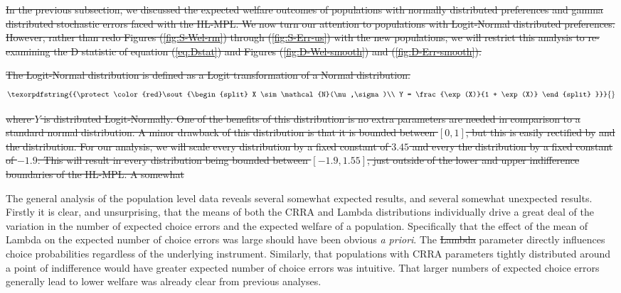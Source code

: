 \documentclass[11pt,a4paper]{report}
\providecommand{\DIFaddtex}[1]{{\protect\color{blue}\uwave{#1}}} %
\providecommand{\DIFdeltex}[1]{{\protect\color{red}\sout{#1}}}                      %
\providecommand{\DIFaddbegin}{} %
\providecommand{\DIFaddend}{} %
\providecommand{\DIFdelbegin}{} %
\providecommand{\DIFdelend}{} %
\providecommand{\DIFadd}[1]{\texorpdfstring{\DIFaddtex{#1}}{#1}} %
\providecommand{\DIFdel}[1]{\texorpdfstring{\DIFdeltex{#1}}{}} %
\newcommand{\DIFscaledelfig}{0.5}
\newlength{\DIFdelgraphicswidth} %
\newlength{\DIFdelgraphicsheight} %
\newcommand{\DIFaddincludegraphics}[2][]{{\color{blue}\fbox{\DIFOincludegraphics[#1]{#2}}}} %
\newcommand{\DIFdelincludegraphics}[2][]{%
\sbox{\DIFdelgraphicsbox}{\DIFOincludegraphics[#1]{#2}}%
\settoboxwidth{\DIFdelgraphicswidth}{\DIFdelgraphicsbox} %
\settoboxtotalheight{\DIFdelgraphicsheight}{\DIFdelgraphicsbox} %
\scalebox{\DIFscaledelfig}{%
\parbox[b]{\DIFdelgraphicswidth}{\usebox{\DIFdelgraphicsbox}\\[-\baselineskip] \rule{\DIFdelgraphicswidth}{0em}}\llap{\resizebox{\DIFdelgraphicswidth}{\DIFdelgraphicsheight}{%
\setlength{\unitlength}{\DIFdelgraphicswidth}%
\begin{picture}(1,1)%
\thicklines\linethickness{2pt} %
{\color[rgb]{1,0,0}\put(0,0){\framebox(1,1){}}}%
{\color[rgb]{1,0,0}\put(0,0){\line( 1,1){1}}}%
{\color[rgb]{1,0,0}\put(0,1){\line(1,-1){1}}}%
\end{picture}%
}\hspace*{3pt}}} %
} %
\DeclareRobustCommand{\DIFaddbegin}{\DIFOaddbegin \let\includegraphics\DIFaddincludegraphics} %
\DeclareRobustCommand{\DIFaddend}{\DIFOaddend \let\includegraphics\DIFOincludegraphics} %
\DeclareRobustCommand{\DIFdelbegin}{\DIFOdelbegin \let\includegraphics\DIFdelincludegraphics} %
\DeclareRobustCommand{\DIFdelend}{\DIFOaddend \let\includegraphics\DIFOincludegraphics} %
\begin{document}
\DIFdelbegin \DIFdel{In the previous subsection, we discussed the expected welfare outcomes of populations with normally distributed preferences and gamma distributed stochastic errors faced with the HL-MPL.
We now turn our attention to populations with Logit-Normal distributed preferences.
However, rather than redo Figures (\ref{fig:S-Wel-rm}) through (\ref{fig:S-Err-us}) with the new populations, we will restrict this analysis to re-examining the D statistic of equation (\ref{eq:Dstat}) and Figures (\ref{fig:D-Wel-smooth}) and (\ref{fig:D-Err-smooth}).
}%

\DIFdel{The Logit-Normal distribution is defined as a Logit transformation of a Normal distribution.
}\begin{align*}
	\DIFdel{\begin{split}
		X \sim \mathcal{N}(\mu,\sigma)\\
		Y = \frac{\exp(X)}{1 + \exp(X)}
	\end{split}
}\end{align*}

\DIFdel{where $Y$ is distributed Logit-Normally.
One of the benefits of this distribution is no extra parameters are needed in comparison to a standard normal distribution.
A minor drawback of this distribution is that it is bounded between $[0,1]$, but this is easily rectified by }%
\DIFdel{and }%
\DIFdel{the distribution.
For our analysis, we will scale every distribution by a fixed constant of $3.45$ and every the distribution by a fixed constant of $-1.9$.
This will result in every distribution being bounded between $[-1.9,1.55]$, just outside of the lower and upper indifference boundaries of the HL-MPL.
A somewhat 
}%

\DIFdelend The general analysis of the population level data reveals several somewhat expected results, and several somewhat unexpected results.
Firstly it is clear, and unsurprising, that the means of both the CRRA and Lambda distributions individually drive a great deal of the variation in the number of expected choice errors and the expected welfare of a population.
Specifically that the effect of the mean of Lambda on the expected number of choice errors was large should have been obvious \textit{a priori}.
The \DIFdelbegin \DIFdel{Lambda }\DIFdelend \DIFaddbegin \DIFadd{$\lambda$ }\DIFaddend parameter directly influences choice probabilities regardless of the underlying instrument.
Similarly, that populations with CRRA parameters tightly distributed around a point of indifference would have greater expected number of choice errors was intuitive.
That larger numbers of expected choice errors generally lead to lower welfare was already clear from previous analyses.
\end{document}
